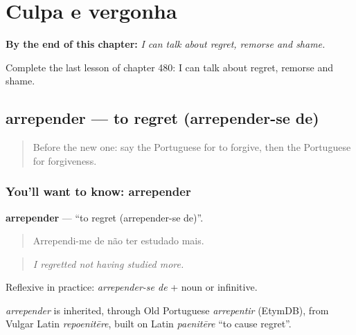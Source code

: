 
\chapter{Culpa e vergonha}
\label{ch:pt-culpa-e-vergonha}

\begin{chapteropening}
\textbf{By the end of this chapter:} \emph{I can talk about regret, remorse and shame.}

Complete the last lesson of chapter 480: I can talk about regret, remorse and shame.
\end{chapteropening}

\section[arrepender]{arrepender — to regret (arrepender-se de)}

\label{lesson:PT-C480-arrepender}



\begin{quote}
Before the new one: say the Portuguese for to forgive, then the Portuguese for forgiveness.
\end{quote}

\subsection*{You'll want to know: arrepender}
\textbf{arrepender} — \textquotedblleft{}to regret (arrepender-se de)\textquotedblright{}.

\begin{quote}
Arrependi-me de não ter estudado mais.
\end{quote}

\begin{quote}
\emph{I regretted not having studied more.}
\end{quote}

Reflexive in practice: \emph{arrepender-se de} + noun or infinitive.

\begin{cousinweb}
\emph{arrepender} is inherited, through Old Portuguese \emph{arrepentir} (EtymDB), from Vulgar Latin \emph{repoenitēre}, built on Latin \emph{paenitēre} \textquotedblleft{}to cause regret\textquotedblright{}.
\end{cousinweb}


